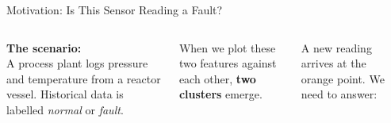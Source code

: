 \documentclass[aspectratio=169,11pt]{beamer}
\begin{document}
\begin{frame}{Motivation: Is This Sensor Reading a Fault?}
\begin{columns}[T]
\textbf{The scenario:}\\
A process plant logs pressure and temperature from a reactor vessel. Historical data is labelled \textit{normal} or \textit{fault}.

\vspace{0.5em}
When we plot these two features against each other, \textbf{two clusters} emerge.

\vspace{0.5em}
A new reading arrives at the orange point. We need to answer:

\vspace{0.3em}
\begin{center}
\end{center}

\end{columns}
\end{frame}
\end{document}
